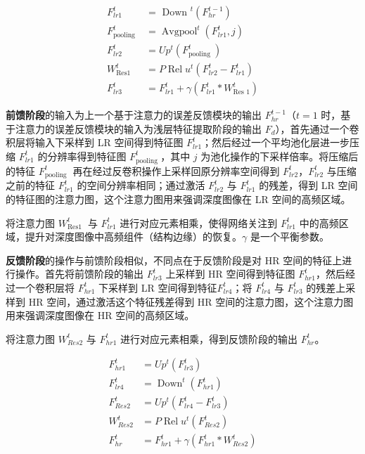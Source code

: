 \documentclass{vip-theme}
\begin{document}
\begin{equation}
\begin{aligned}
F_{l r 1}^{t} &=\text { Down }^{t}\left(F_{h r}^{t-1}\right)\\
F_{\text {pooling }}^{t} &=\operatorname{Avgpool}^{t}\left(F_{l r 1}^{t}, j\right)\\
F_{l r 2}^{t} &=U p^{t}\left(F_{\text {pooling }}^{t}\right)\\
W_{\text {Res1 }}^{t} &=P \operatorname{Rel} u^{t}\left(F_{l r 2}^{t}-F_{l r 1}^{t}\right)\\
F_{l r 3}^{t} &=F_{l r 1}^{t}+\gamma\left(F_{l r 1}^{t} * W_{\text {Res } 1}^{t}\right)
\end{aligned}
\end{equation}

\textbf{前馈阶段}的输入为上一个基于注意力的误差反馈模块的输出 $F_{h r}^{t-1}$（$t=1$ 时，基于注意力的误差反馈模块的输入为浅层特征提取阶段的输出 $F_d$），首先通过一个卷积层将输入下采样到 LR 空间得到特征图 $F_{l r 1}^{t}$；然后经过一个平均池化层进一步压缩 $F_{l r 1}^{t}$ 的分辨率得到特征图 $F_{\text {pooling }}^{t} $，其中 $j$ 为池化操作的下采样倍率。将压缩后的特征 $F_{\text {pooling }}^{t} $ 再在经过反卷积操作上采样回原分辨率空间得到 $F_{l r 2}^{t}$，$F_{l r 2}^{t}$ 与压缩之前的特征 $F_{l r 1}^{t}$ 的空间分辨率相同；通过激活 $F_{l r 2}^{t}$ 与 $F_{l r 1}^{t}$ 的残差，得到 LR 空间的特征图的注意力图，这个注意力图用来强调深度图像在 LR 空间的高频区域。

将注意力图 $W_{\text {Res1 }}^{t}$ 与 $F_{l r 1}^{t}$ 进行对应元素相乘，使得网络关注到 $F_{l r 1}^{t}$ 中的高频区域，提升对深度图像中高频组件（结构边缘）的恢复。$\gamma$ 是一个平衡参数。

\textbf{反馈阶段}的操作与前馈阶段相似，不同点在于反馈阶段是对 HR 空间的特征上进行操作。首先将前馈阶段的输出 $F_{l r 3}^{t}$ 上采样到 HR 空间得到特征图 $F_{h r 1}^{t}$，然后经过一个卷积层将 $F_{h r 1}^{t}$ 下采样到 LR 空间得到特征$F_{l r 4}^{t}$；将 $F_{l r 4}^{t}$ 与 $F_{l r 3}^{t}$ 的残差上采样到 HR 空间，通过激活这个特征残差得到 HR 空间的注意力图，这个注意力图用来强调深度图像在 HR 空间的高频区域。

将注意力图 $W_{R e s 2}^{t}$ 与 $F_{h r 1}^{t}	$ 进行对应元素相乘，得到反馈阶段的输出 $F_{h r}^{t}$。

\begin{equation}
\begin{aligned}
F_{h r 1}^{t} &=U p^{t}\left(F_{l r 3}^{t}\right) \\
F_{l r 4}^{t} &=\operatorname{Down}^{t}\left(F_{h r 1}^{t}\right) \\
F_{R e s 2}^{t} &=U p^{t}\left(F_{l r 4}^{t}-F_{l r 3}^{t}\right) \\
W_{R e s 2}^{t} &=P \operatorname{Rel} u^{t}\left(F_{R e s 2}^{t}\right) \\
F_{h r}^{t} &=F_{h r 1}^{t}+\gamma\left(F_{h r 1}^{t} * W_{R e s 2}^{t}\right)
\end{aligned}
\end{equation}
\end{document}
